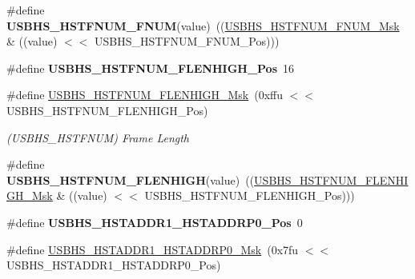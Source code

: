 \begin{DoxyCompactItemize}
\mbox{\label{group__SAMS70__USBHS_gaf48953926e186a304e74e8fe451f9d9b}} 
\#define {\bfseries U\+S\+B\+H\+S\+\_\+\+H\+S\+T\+F\+N\+U\+M\+\_\+\+F\+N\+UM}(value)~((\mbox{\hyperlink{group__SAMV71__USBHS_ga12d53a196a1de6bf54b6a602413ee6ba}{U\+S\+B\+H\+S\+\_\+\+H\+S\+T\+F\+N\+U\+M\+\_\+\+F\+N\+U\+M\+\_\+\+Msk}} \& ((value) $<$$<$ U\+S\+B\+H\+S\+\_\+\+H\+S\+T\+F\+N\+U\+M\+\_\+\+F\+N\+U\+M\+\_\+\+Pos)))
\item 
\mbox{\label{group__SAMS70__USBHS_gac54b502818dd048054072353a8c118a8}} 
\#define {\bfseries U\+S\+B\+H\+S\+\_\+\+H\+S\+T\+F\+N\+U\+M\+\_\+\+F\+L\+E\+N\+H\+I\+G\+H\+\_\+\+Pos}~16
\item 
\mbox{\label{group__SAMS70__USBHS_ga40c06afa00bf9111922d09694dcee259}} 
\#define \mbox{\hyperlink{group__SAMS70__USBHS_ga40c06afa00bf9111922d09694dcee259}{U\+S\+B\+H\+S\+\_\+\+H\+S\+T\+F\+N\+U\+M\+\_\+\+F\+L\+E\+N\+H\+I\+G\+H\+\_\+\+Msk}}~(0xffu $<$$<$ U\+S\+B\+H\+S\+\_\+\+H\+S\+T\+F\+N\+U\+M\+\_\+\+F\+L\+E\+N\+H\+I\+G\+H\+\_\+\+Pos)
\begin{DoxyCompactList}\small\item\em (U\+S\+B\+H\+S\+\_\+\+H\+S\+T\+F\+N\+UM) Frame Length \end{DoxyCompactList}\item 
\mbox{\label{group__SAMS70__USBHS_ga74560a368797e55618ef4fcef9df6245}} 
\#define {\bfseries U\+S\+B\+H\+S\+\_\+\+H\+S\+T\+F\+N\+U\+M\+\_\+\+F\+L\+E\+N\+H\+I\+GH}(value)~((\mbox{\hyperlink{group__SAMV71__USBHS_ga40c06afa00bf9111922d09694dcee259}{U\+S\+B\+H\+S\+\_\+\+H\+S\+T\+F\+N\+U\+M\+\_\+\+F\+L\+E\+N\+H\+I\+G\+H\+\_\+\+Msk}} \& ((value) $<$$<$ U\+S\+B\+H\+S\+\_\+\+H\+S\+T\+F\+N\+U\+M\+\_\+\+F\+L\+E\+N\+H\+I\+G\+H\+\_\+\+Pos)))
\item 
\mbox{\label{group__SAMS70__USBHS_ga423f427c614cb5373d16a599593db7a0}} 
\#define {\bfseries U\+S\+B\+H\+S\+\_\+\+H\+S\+T\+A\+D\+D\+R1\+\_\+\+H\+S\+T\+A\+D\+D\+R\+P0\+\_\+\+Pos}~0
\item 
\mbox{\label{group__SAMS70__USBHS_ga8af8a1d1df9aa442c92d6da93239944c}} 
\#define \mbox{\hyperlink{group__SAMS70__USBHS_ga8af8a1d1df9aa442c92d6da93239944c}{U\+S\+B\+H\+S\+\_\+\+H\+S\+T\+A\+D\+D\+R1\+\_\+\+H\+S\+T\+A\+D\+D\+R\+P0\+\_\+\+Msk}}~(0x7fu $<$$<$ U\+S\+B\+H\+S\+\_\+\+H\+S\+T\+A\+D\+D\+R1\+\_\+\+H\+S\+T\+A\+D\+D\+R\+P0\+\_\+\+Pos)

\end{DoxyCompactItemize}
